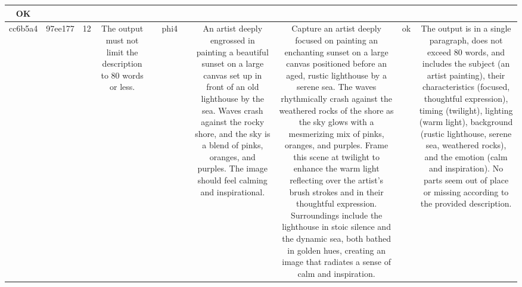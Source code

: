 \begin{table}[h!]
\begin{tabular}{|c|c|c|c|c|c|c|c|c|c|c|}
OK\\
\hline
cc6b5a4 & 97ee177 & 12 & The output must not limit the description to 80 words or less. &  & phi4 &  & An artist deeply engrossed in painting a beautiful sunset on a large canvas set up in front of an old lighthouse by the sea. Waves crash against the rocky shore, and the sky is a blend of pinks, oranges, and purples. The image should feel calming and inspirational. & Capture an artist deeply focused on painting an enchanting sunset on a large canvas positioned before an aged, rustic lighthouse by a serene sea. The waves rhythmically crash against the weathered rocks of the shore as the sky glows with a mesmerizing mix of pinks, oranges, and purples. Frame this scene at twilight to enhance the warm light reflecting over the artist's brush strokes and in their thoughtful expression. Surroundings include the lighthouse in stoic silence and the dynamic sea, both bathed in golden hues, creating an image that radiates a sense of calm and inspiration. & ok & The output is in a single paragraph, does not exceed 80 words, and includes the subject (an artist painting), their characteristics (focused, thoughtful expression), timing (twilight), lighting (warm light), background (rustic lighthouse, serene sea, weathered rocks), and the emotion (calm and inspiration). No parts seem out of place or missing according to the provided description.


\end{tabular}
\end{table}
